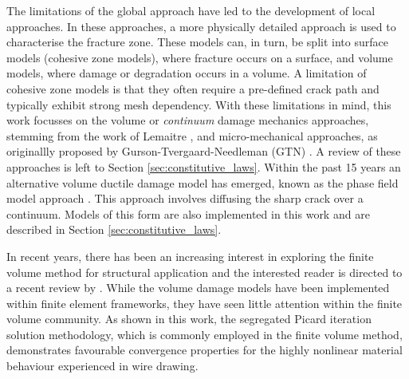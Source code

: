 \documentclass[sn-mathphys,Numbered]{sn-jnl}%
\begin{document}
The limitations of the global approach have led to the development of local approaches. In these approaches, a more physically detailed approach is used to characterise the fracture zone.
These models can, in turn, be split into surface models (cohesive zone models), where fracture occurs on a surface, and volume models, where damage or degradation occurs in a volume.
A limitation of cohesive zone models is that they often require a pre-defined crack path and typically exhibit strong mesh dependency.
With these limitations in mind, this work focusses on the volume or \emph{continuum} damage mechanics approaches, stemming from the work of Lemaitre \cite{lemaitre_continuous_1985,lemaitre_engineering_2005}, and micro-mechanical approaches, as originallly proposed by Gurson-Tvergaard-Needleman (GTN) \cite{gurson_continuum_1977,tvergaard_analysis_1984}.
A review of these approaches is left to Section \ref{sec:constitutive_laws}.
Within the past 15 years an alternative volume ductile damage model has emerged, known as the phase field model approach \cite{ambati_phase-field_2015, borden_phase-field_2016, miehe_phase_2016, dittmann_variational_2018, samaniego_phase-field_2021}. This approach involves diffusing the sharp crack over a continuum.
Models of this form are also implemented in this work and are described in Section \ref{sec:constitutive_laws}.


In recent years, there has been an increasing interest in exploring the finite volume method for structural application and the interested reader is directed to a recent review by \citet{cardiff_thirty_2021}.
While the volume damage models have been implemented within finite element frameworks, they have seen little attention within the finite volume community.
As shown in this work, the segregated Picard iteration solution methodology, which is commonly employed in the finite volume method, demonstrates favourable convergence properties for the highly nonlinear material behaviour experienced in wire drawing.
\end{document}
